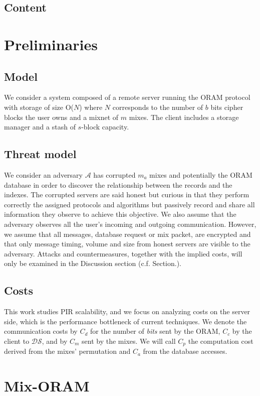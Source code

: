 \documentclass[a4paper]{article}
\begin{document}
\subsection{Content}

\section{Preliminaries}
\subsection{Model}
We consider a system composed of a remote server running the ORAM protocol with storage of size O($N$) where $N$ corresponds to the number of $b$ bits cipher blocks the user owns and a mixnet of $m$ mixes.
The client includes a storage manager and a stash of $s$-block capacity. 

\subsection{Threat model}
We consider an adversary $\mathcal{A}$ has corrupted $m_{a}$ mixes and potentially the ORAM database in order to discover the relationship between the records and the indexes. 
The corrupted servers are said honest but curious in that they perform correctly the assigned protocols and algorithms but passively record and share all information they observe to achieve this objective.
We also assume that the adversary observes all the user's incoming and outgoing communication.
However, we assume that all messages, database request or mix packet, are encrypted and that only message timing, volume and size from honest servers are visible to the adversary.
Attacks and countermeasures, together with the implied costs, will only be examined in the Discussion section (c.f. Section.\cite{}).

\subsection{Costs}
This work studies PIR scalability, and we focus on analyzing costs on the server side, which is the performance bottleneck of current techniques.
We denote the communication costs by $C_d$ for the number of \emph{bits} sent by the ORAM, $C_{c}$ by the client to $\mathcal{DS}$, and by $C_{m}$ sent by the mixes. 
We will call $C_p$ the computation cost derived from the mixes' permutation and $C_a$ from the database accesses.


\section{Mix-ORAM}
\end{document}
